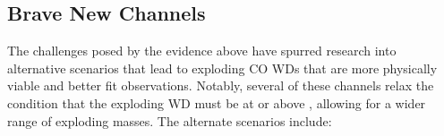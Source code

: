 

\subsection{Brave New Channels}
\label{ssec:c1_new_typeia}


The challenges posed by the evidence above have spurred research into alternative scenarios that lead to exploding CO WDs that are more physically viable and better fit observations.  Notably, several of these channels relax the condition that the exploding WD must be at or above \Mch, allowing for a wider range of exploding masses.  The alternate scenarios include:

